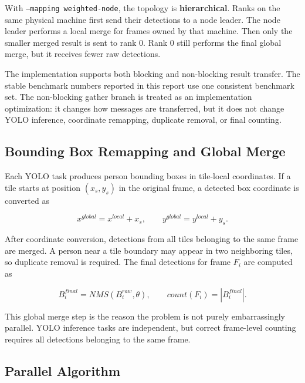 With \texttt{--mapping weighted-node}, the topology is \textbf{hierarchical}. Ranks on the same physical machine first send their detections to a node leader. The node leader performs a local merge for frames owned by that machine. Then only the smaller merged result is sent to rank 0. Rank 0 still performs the final global merge, but it receives fewer raw detections.

The implementation supports both blocking and non-blocking result transfer. The stable benchmark numbers reported in this report use one consistent benchmark set. The non-blocking gather branch is treated as an implementation optimization: it changes how messages are transferred, but it does not change YOLO inference, coordinate remapping, duplicate removal, or final counting.

\subsection{Bounding Box Remapping and Global Merge}

Each YOLO task produces person bounding boxes in tile-local coordinates. If a tile starts at position $(x_s, y_s)$ in the original frame, a detected box coordinate is converted as

\[
x^{global} = x^{local} + x_s,
\qquad
y^{global} = y^{local} + y_s.
\]

After coordinate conversion, detections from all tiles belonging to the same frame are merged. A person near a tile boundary may appear in two neighboring tiles, so duplicate removal is required. The final detections for frame $F_i$ are computed as

\[
B_i^{final} = NMS(B_i^{raw}, \theta),
\qquad
count(F_i) = |B_i^{final}|.
\]

This global merge step is the reason the problem is not purely embarrassingly parallel. YOLO inference tasks are independent, but correct frame-level counting requires all detections belonging to the same frame.

\subsection{Parallel Algorithm}

